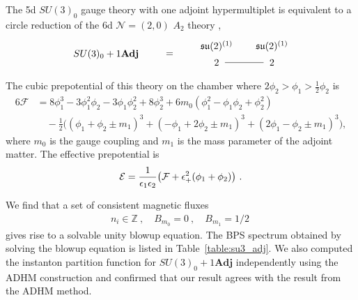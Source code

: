 The 5d $ SU(3)_0 $ gauge theory with one adjoint hypermultiplet is equivalent to a circle reduction of the 6d $ \mathcal{N}=(2, 0) $ $ A_2$ theory \cite{Bhardwaj:2019fzv},
\begin{align}
\begin{tikzpicture}
\draw (0, 0) node {$ SU(3)_0 + 1\mathbf{Adj} $}
(2.3, 0) node {$ = $}
(4, 0.3) node {$ \mathfrak{su}(2)^{(1)} $}
(4, -0.3) node {$ 2 $}
(6, 0.3) node {$ \mathfrak{su}(2)^{(1)} $}
(6, -0.3) node {$ 2 $}
(4.3, -0.3) -- (5.7, -0.3);
\end{tikzpicture}
\end{align}
The cubic prepotential of this theory on the chamber where $2\phi_2>\phi_1 > \frac{1}{2}\phi_2$ is
\begin{align}
6\mathcal{F}
&= 8\phi_1^3 - 3\phi_1^2 \phi_2 - 3\phi_1 \phi_2^2 + 8\phi_2^3 + 6m_0 (\phi_1^2 - \phi_1 \phi_2 + \phi_2^2) \nonumber \\
& \quad - \frac{1}{2}\Big((\phi_1 + \phi_2 \pm m_1)^3 + (-\phi_1 + 2\phi_2 \pm m_1)^3 + (2\phi_1 - \phi_2 \pm m_1)^3 \Big),
\end{align}
where $ m_0 $ is the gauge coupling and $ m_1 $ is the mass parameter of the adjoint matter. The effective prepotential is
\begin{align}
\mathcal{E}
= \frac{1}{\epsilon_1 \epsilon_2} \qty(\mathcal{F} + \epsilon_+^2 (\phi_1 + \phi_2)) \ .
\end{align}

We find that a set of consistent magnetic fluxes
\begin{align}
n_i \in \mathbb{Z} \ , \quad
B_{m_0} = 0 \ , \quad
B_{m_1} = 1/2 \ 
\end{align}
gives rise to a solvable unity blowup equation.
The BPS spectrum obtained by solving the blowup equation is listed in Table~\ref{table:su3_adj}. We also computed the instanton partition function for $ SU(3)_0 + 1\mathbf{Adj}$ independently using the ADHM construction and confirmed that our result agrees with the result from the ADHM method.

